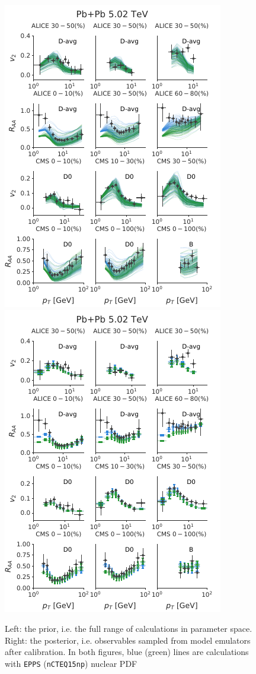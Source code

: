 \documentclass[aps, prc, reprint, amsmath, groupedaddress, nofootinbib]{revtex4-1}
\begin{document}
\begin{figure}
\includegraphics[width=.49\textwidth]{observables_design.pdf}
\includegraphics[width=.49\textwidth]{observables_posterior.pdf}
\caption{Left: the prior, i.e. the full range of calculations in parameter space. Right: the posterior, i.e. observables sampled from model emulators after calibration. In both figures, blue (green) lines are calculations with {\tt EPPS} ({\tt nCTEQ15np}) nuclear PDF}\label{plots:deisgn_posterior_obs}
\end{figure}
\end{document}
